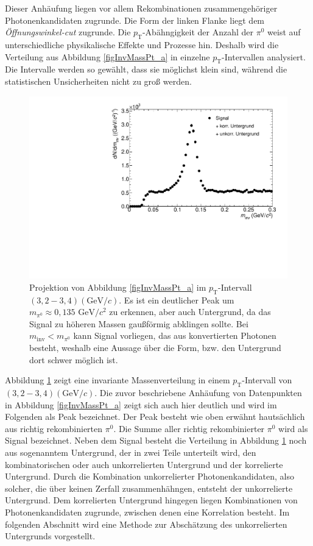 Dieser Anh\"aufung liegen vor allem Rekombinationen zusammengeh\"origer Photonenkandidaten zugrunde.
Die Form der linken Flanke liegt dem \textit{\"Offnungswinkel-cut} zugrunde.
\newline
Die $p_{\text{T}}$-Ab\"ahngigkeit der Anzahl der $\pi^{0}$ weist auf unterschiedliche physikalische Effekte und Prozesse hin.
Deshalb wird die Verteilung aus Abbildung \ref{figInvMassPt_a} in einzelne $p_{\text{T}}$-Intervallen analysiert.
Die Intervalle werden so gew{\"a}hlt, dass sie m{\"o}glichst klein sind, w{\"a}hrend die statistischen Unsicherheiten nicht zu gro{\ss} werden.
\begin{figure}[tbp]
\centering
\includegraphics[width=.75\linewidth]{hSignalPlusBkg.pdf}
\caption{Projektion von Abbildung \ref{figInvMassPt_a} im $p_{\text{T}}$-Intervall $(3,2 - 3,4) (\text{GeV/}c)$. Es ist ein deutlicher Peak um $m_{\pi^{0}} \approx 0,135\text{ GeV/}c^{2}$ zu erkennen, aber auch Untergrund, da das Signal zu h{\"o}heren Massen gau{\ss}f{\"o}rmig abklingen sollte. Bei $m_{\text{inv}} < m_{\pi^{0}}$ kann Signal vorliegen, das aus konvertierten Photonen besteht, weshalb eine Aussage {\"u}ber die Form, bzw. den Untergrund dort schwer m{\"o}glich ist.}
\label{figSignalPlusBkg}
\end{figure}
\newline
Abbildung \ref{figSignalPlusBkg} zeigt eine invariante Massenverteilung in einem $p_{\text{T}}$-Intervall von $(3,2 - 3,4)(\text{GeV}/c)$.
Die zuvor beschriebene Anh\"aufung von Datenpunkten in Abbildung \ref{figInvMassPt_a} zeigt sich auch hier deutlich und wird im Folgenden als Peak bezeichnet.
Der Peak besteht wie oben erw\"ahnt hauts\"achlich aus richtig rekombinierten $\pi^{0}$.
Die Summe aller richtig rekombinierter $\pi^{0}$ wird als Signal bezeichnet.
Neben dem Signal besteht die Verteilung in Abbildung \ref{figSignalPlusBkg} noch aus sogenanntem Untergrund, der in zwei Teile unterteilt wird, den kombinatorischen oder auch unkorrelierten Untergrund und der korrelierte Untergrund.
Durch die Kombination unkorrelierter Photonenkandidaten, also solcher, die \"uber keinen Zerfall zusammenh\"ahngen, entsteht der unkorrelierte Untergrund.
Dem korrelierten Untergrund hingegen liegen Kombinationen von Photonenkandidaten zugrunde, zwischen denen eine Korrelation besteht.
\newline
Im folgenden Abschnitt wird eine Methode zur Absch\"atzung des unkorrelierten Untergrunds vorgestellt. 